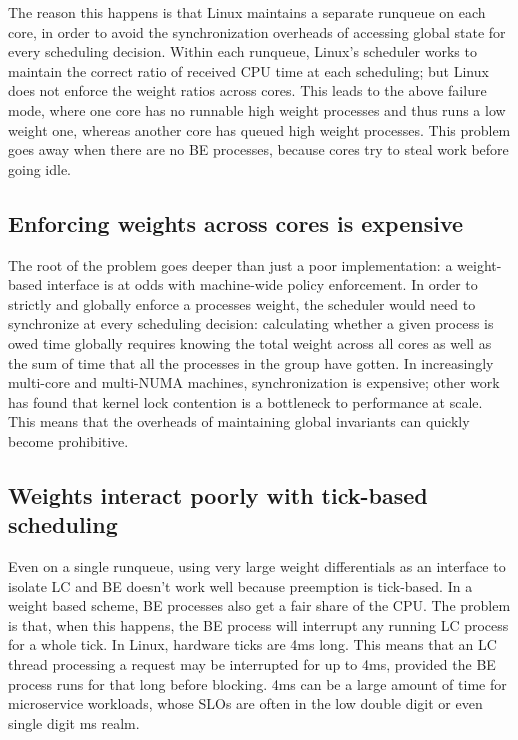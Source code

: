 The reason this happens is that Linux maintains a separate runqueue on each
core, in order to avoid the synchronization overheads of accessing global state
for every scheduling decision. Within each runqueue, Linux's scheduler works to
maintain the correct ratio of received CPU time at each scheduling; but Linux
does not enforce the weight ratios across cores. This leads to the above failure
mode, where one core has no runnable high weight processes and thus runs a low
weight one, whereas another core has queued high weight processes. This problem
goes away when there are no BE processes, because cores try to steal work before
going idle.

\subsection{Enforcing weights across cores is
expensive}\label{ss:problem:cross-core-hard}

The root of the problem goes deeper than just a poor implementation: a
weight-based interface is at odds with machine-wide policy enforcement. In order
to strictly and globally enforce a processes weight, the scheduler would need to
synchronize at every scheduling decision: calculating whether a given process is
owed time globally requires knowing the total weight across all cores as well as
the sum of time that all the processes in the group have gotten. In increasingly
multi-core and multi-NUMA machines, synchronization is expensive; other work has
found that kernel lock contention is a bottleneck to performance at
scale.~\cite{afaas} This means that the overheads of maintaining global
invariants can quickly become prohibitive.


\subsection{Weights interact poorly with tick-based
scheduling}\label{ss:problem:quantum}

Even on a single runqueue, using very large weight differentials as an interface
to isolate LC and BE doesn't work well because preemption is tick-based. In a
weight based scheme, BE processes also get a fair share of the CPU. The problem
is that, when this happens, the BE process will interrupt any running LC process
for a whole tick. In Linux, hardware ticks are 4ms long. This means that an LC
thread processing a request may be interrupted for up to 4ms, provided the BE
process runs for that long before blocking. 4ms can be a large amount of time
for microservice workloads, whose SLOs are often in the low double digit or even
single digit ms realm.~\cite{sigmaos}




